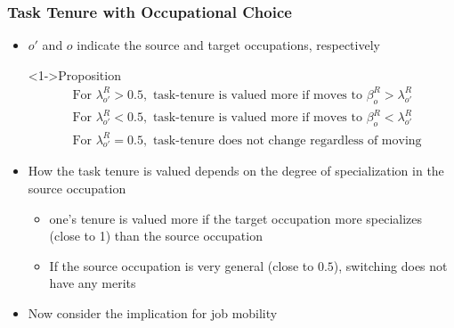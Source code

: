 \documentclass[11pt]{beamer}
\begin{document}




\begin{frame}
	\frametitle{Task Tenure with Occupational Choice}
	\begin{itemize}
		\item $o'$ and $o$ indicate the source and target occupations, respectively
	\begin{block}<1->{Proposition}
\begin{align*}
	&\text{For }\lambda_{o'}^R>0.5,\text{ task-tenure is valued more if moves to }\beta_o^R > \lambda_{o'}^R\\
	&\text{For }\lambda_{o'}^R<0.5,\text{ task-tenure is valued more if moves to }\beta_o^R < \lambda_{o'}^R\\
	&\text{For }\lambda_{o'}^R = 0.5,\text{ task-tenure does not change regardless of moving}
\end{align*}
	\end{block}
		\item How the task tenure is valued depends on the degree of specialization in the source occupation
		\begin{itemize}
			\item one's tenure is valued more if the target occupation more specializes (close to 1) than the source occupation
			\item If the source occupation is very general (close to $0.5$), switching does not have any merits
		\end{itemize}
		\item Now consider the implication for job mobility
	\end{itemize}
\end{frame}
\end{document}
